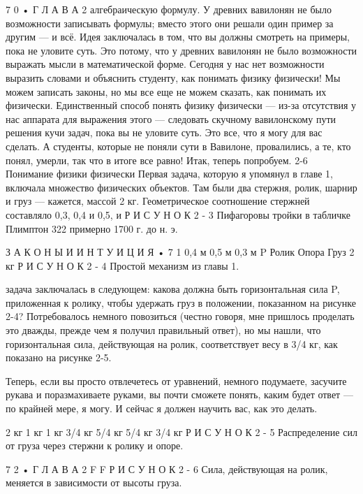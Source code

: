 \documentclass[10pt,oneside]{article}
\begin{document}
7 0 • Г Л А В А  2 алгебраическую формулу. У древних вавилонян не было возможности записывать формулы; вместо этого они решали один пример за другим --- и всё. Идея заключалась в том, что вы должны смотреть на примеры, пока не уловите суть. Это потому, что у древних вавилонян не было возможности выражать мысли в математической форме. Сегодня у нас нет возможности выразить словами и объяснить студенту, как понимать физику физически! Мы можем записать законы, но мы все еще не можем сказать, как понимать их физически. Единственный способ понять физику физически --- из-за отсутствия у нас аппарата для выражения этого --- следовать скучному вавилонскому пути решения кучи задач, пока вы не уловите суть. Это все, что я могу для вас сделать. А студенты, которые не поняли сути в Вавилоне, провалились, а те, кто понял, умерли, так что в итоге все равно! Итак, теперь попробуем. 2-6 Понимание физики физически Первая задача, которую я упомянул в главе 1, включала множество физических объектов. Там были два стержня, ролик, шарнир и груз --- кажется, массой 2 кг. Геометрическое соотношение стержней составляло 0,3, 0,4 и 0,5, и Р И С У Н О К  2 - 3 Пифагоровы тройки в табличке Плимптон 322 примерно 1700 г. до н. э.\par

З А К О Н Ы  И  И Н Т У И Ц И Я • 7 1 0,4 м 0,5 м 0,3 м P Ролик Опора Груз 2 кг Р И С У Н О К  2 - 4 Простой механизм из главы 1.\par

задача заключалась в следующем: какова должна быть горизонтальная сила P, приложенная к ролику, чтобы удержать груз в положении, показанном на рисунке 2-4? Потребовалось немного повозиться (честно говоря, мне пришлось проделать это дважды, прежде чем я получил правильный ответ), но мы нашли, что горизонтальная сила, действующая на ролик, соответствует весу в 3/4 кг, как показано на рисунке 2-5.\par

Теперь, если вы просто отвлечетесь от уравнений, немного подумаете, засучите рукава и поразмахиваете руками, вы почти сможете понять, каким будет ответ --- по крайней мере, я могу. И сейчас я должен научить вас, как это делать.\par

2 кг 1 кг 1 кг 3/4 кг 5/4 кг 5/4 кг 3/4 кг Р И С У Н О К  2 - 5 Распределение сил от груза через стержни к ролику и опоре.\par

7 2 • Г Л А В А  2 F F Р И С У Н О К  2 - 6 Сила, действующая на ролик, меняется в зависимости от высоты груза.\par
\end{document}
